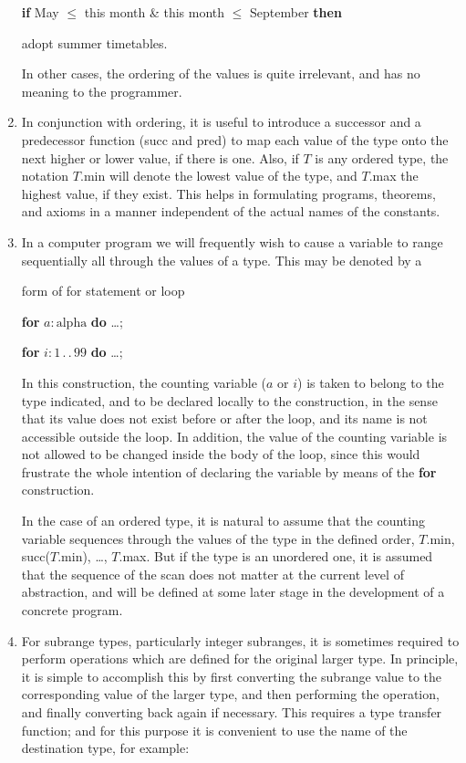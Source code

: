 \begin{enumerate}[leftmargin=2\parindent, label=(\arabic*)]
	\quad \textbf{if} May $\leqslant$ this month \& this month $\leqslant$ September \textbf{then}
	
	\qquad adopt summer timetables. 
	
	\noindent
	In other cases, the ordering of the values is quite irrelevant, and has no meaning to the programmer.
	
	\item In conjunction with ordering, it is useful to introduce a successor and a predecessor function (succ and pred) to map each value of the type onto the next higher or lower value, if there is one. Also, if $T$ is any ordered type, the notation $T$.min will denote the lowest value of the type, and $T$.max the highest value, if they exist. This helps in formulating programs, theorems, and axioms in a manner independent of the actual names of the constants.
	\item In a computer program we will frequently wish to cause a variable to range sequentially all through the values of a type. This may be denoted by a
	
	form of for statement or loop
	
	\textbf{for} $a:\text{alpha}$ \textbf{do} \dots;
	
	\textbf{for} $i:1\,.\,.\,99$ \textbf{do} \dots;
	
	In this construction, the counting variable ($a$ or $i$) is taken to belong to the type indicated, and to be declared locally to the construction, in the sense that its value does not exist before or after the loop, and its name is not accessible outside the loop. In addition, the value of the counting variable is not allowed to be changed inside the body of the loop, since this would frustrate the whole intention of declaring the variable by means of the \textbf{for} construction.
	
	In the case of an ordered type, it is natural to assume that the counting variable sequences through the values of the type in the defined order, $T.$min, succ($T.$min), \dots, $T.$max. But if the type is an unordered one, it is assumed that the sequence of the scan does not matter at the current level of abstraction, and will be defined at some later stage in the development of a concrete program.
	
	\item For subrange types, particularly integer subranges, it is sometimes required to perform operations which are defined for the original larger type. In principle, it is simple to accomplish this by first converting the subrange value to the corresponding value of the larger type, and then performing the operation, and finally converting back again if necessary. This requires a type transfer function; and for this purpose it is convenient to use the name of the destination type, for example:
	

\end{enumerate}

